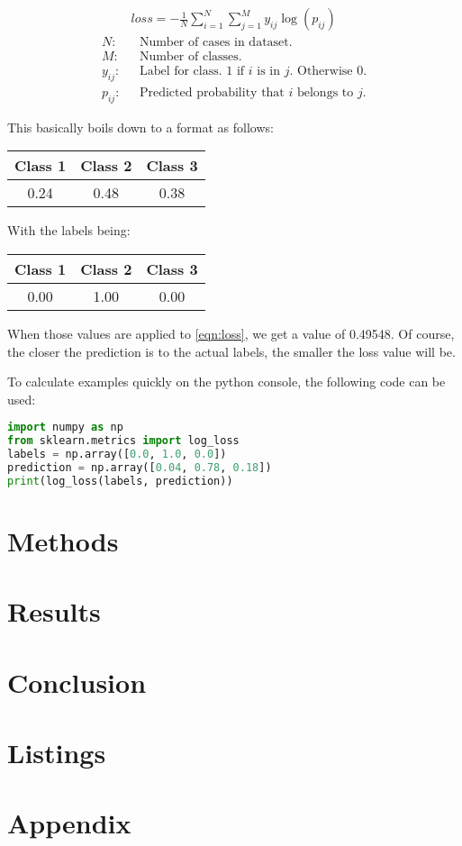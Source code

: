 \documentclass[titlepage]{article}
\begin{document}
\begin{align}\label{eqn:loss}
&loss = -\frac1N\sum_{i=1}^N\sum_{j=1}^My_{ij}\log\left(p_{ij}\right)\\
\nonumber
N: & \hspace{8pt} \textrm{Number of cases in dataset.}\\
\nonumber
M: & \hspace{8pt} \textrm{Number of classes.}\\
\nonumber
y_{ij}: & \hspace{8pt} \textrm{Label for class. 1 if $i$ is in $j$. Otherwise 0.}\\
\nonumber
p_{ij}: & \hspace{8pt} \textrm{Predicted probability that $i$ belongs to $j$.}
\end{align}

This basically boils down to a format as follows:

\begin{center}
\begin{tabular}{c|c|c}
Class 1 & Class 2 & Class 3\\\hline
0.24 & 0.48 & 0.38
\end{tabular}
\end{center}

With the labels being:

\begin{center}
\begin{tabular}{c|c|c}
Class 1 & Class 2 & Class 3\\\hline
0.00 & 1.00 & 0.00
\end{tabular}
\end{center}

When those values are applied to \ref{eqn:loss}, we get a value of 0.49548. Of course, the closer the prediction is to the actual labels, the smaller the loss value will be.

To calculate examples quickly on the python console, the following code can be used:
\begin{lstlisting}[language=python,otherkeywords={as}]
import numpy as np
from sklearn.metrics import log_loss
labels = np.array([0.0, 1.0, 0.0])
prediction = np.array([0.04, 0.78, 0.18])
print(log_loss(labels, prediction))
\end{lstlisting}


\pagebreak
\section{Methods}\label{s:methods}

\pagebreak
\section{Results}\label{s:results}

\pagebreak
\section{Conclusion}\label{s:conclusion}

\pagebreak
\section{Listings}\label{s:listings}
\label{bib}

\pagebreak
\appendix
\section{Appendix}\label{s:appendix}
\end{document}
